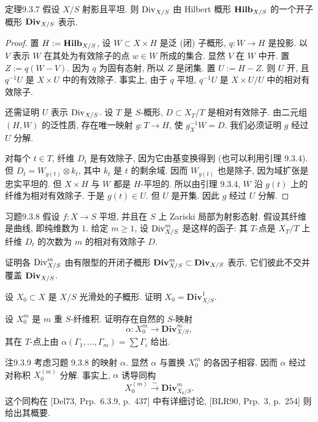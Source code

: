 \begin{origstatement}{定理}{9.3.7}\label{ch09s03:thm937}
假设 $X/S$ 射影且平坦. 则 $\operatorname{Div}_{X/S}$ 由 Hilbert 概形 $\mathbf{Hilb}_{X/S}$ 的一个开子概形 $\mathbf{Div}_{X/S}$ 表示.
\end{origstatement}
\begin{proof}
置 $H:=\mathbf{Hilb}_{X/S}$, 设 $W\subset X\times H$ 是泛 (闭) 子概形, $q:W\to H$ 是投影. 以 $V$ 表示 $W$ 在其处为有效除子的点 $w\in W$ 所成的集合. 显然 $V$ 在 $W$ 中开. 置 $Z:=q(W-V)$. 因为 $q$ 为固有态射, 所以 $Z$ 是闭集. 置 $U:=H-Z$. 则 $U$ 开, 且 $q^{-1}U$ 是 $X\times U$ 中的有效除子. 事实上, 由于 $q$ 平坦, $q^{-1}U$ 是 $X\times U/U$ 中的相对有效除子.

还需证明 $U$ 表示 $\operatorname{Div}_{X/S}$. 设 $T$ 是 $S$-概形, $D\subset X_T/T$ 是相对有效除子. 由二元组 $(H,W)$ 的泛性质, 存在唯一映射 $g:T\to H$, 使 $g_X^{-1}W=D$. 我们必须证明 $g$ 经过 $U$ 分解.

对每个 $t\in T$, 纤维 $D_t$ 是有效除子, 因为它由基变换得到 (也可以利用引理 9.3.4). 但 $D_t=W_{g(t)}\otimes k_t$, 其中 $k_t$ 是 $t$ 的剩余域. 因而 $W_{g(t)}$ 也是除子, 因为域扩张是忠实平坦的. 但 $X\times H$ 与 $W$ 都是 $H$-平坦的. 所以由引理 9.3.4, $W$ 沿 $g(t)$ 上的纤维为相对有效除子. 于是 $g(t)\in U$. 但 $U$ 是开集. 因此 $g$ 经过 $U$ 分解.
\end{proof}

\begin{origstatement}{习题}{9.3.8}\label{ch09s03:ex938}
假设 $f:X\to S$ 平坦, 并且在 $S$ 上 Zariski 局部为射影态射. 假设其纤维是曲线, 即纯维数为 $1$. 给定 $m\geq1$, 设 $\operatorname{Div}_{X/S}^m$ 是这样的函子: 其 $T$-点是 $X_T/T$ 上纤维 $D_t$ 的次数为 $m$ 的相对有效除子 $D$.

证明各 $\operatorname{Div}_{X/S}^m$ 由有限型的开闭子概形 $\mathbf{Div}_{X/S}^m\subset\mathbf{Div}_{X/S}$ 表示, 它们彼此不交并覆盖 $\mathbf{Div}_{X/S}$.

设 $X_0\subset X$ 是 $X/S$ 光滑处的子概形. 证明 $X_0=\mathbf{Div}_{X/S}^1$.

设 $X_0^m$ 是 $m$ 重 $S$-纤维积. 证明存在自然的 $S$-映射
\[
\alpha:X_0^m\longrightarrow\mathbf{Div}_{X/S}^m,
\]
其在 $T$-点上由 $\alpha(\Gamma_1,\ldots,\Gamma_m)=\sum\Gamma_i$ 给出.
\end{origstatement}

\begin{origstatement}{注}{9.3.9}\label{ch09s03:rem939}
考虑习题 9.3.8 的映射 $\alpha$. 显然 $\alpha$ 与置换 $X_0^m$ 的各因子相容. 因而 $\alpha$ 经过对称积 $X_0^{(m)}$ 分解. 事实上, $\alpha$ 诱导同构
\[
X_0^{(m)}\xrightarrow{\sim}\mathbf{Div}_{X_0/S}^m.
\]
这个同构在 [Del73, Prp.~6.3.9, p.~437] 中有详细讨论, [BLR90, Prp.~3, p.~254] 则给出其概要.
\end{origstatement}

